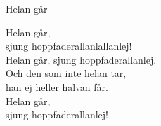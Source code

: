 \begin{song}{Helan går}
	
	Helan går,\\
	sjung hoppfaderallanlallanlej!\\
	Helan går, sjung hoppfaderallanlej.\\
	Och den som inte helan tar,\\
	han ej heller halvan får.\\
	Helan går,\\
	sjung hoppfaderallanlej!
	
\end{song}
